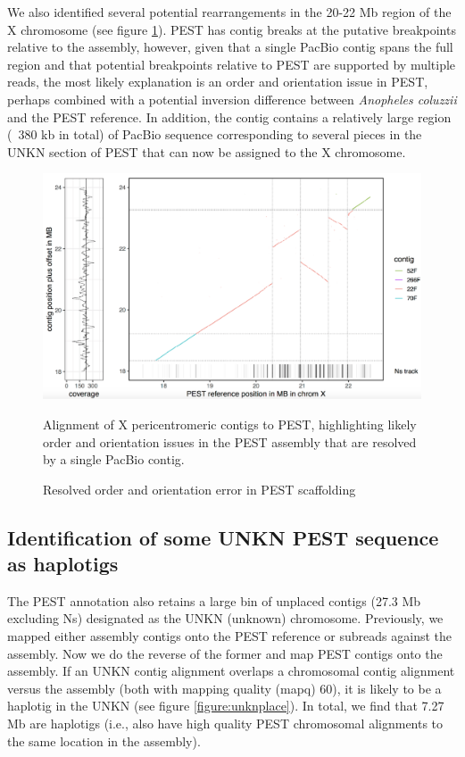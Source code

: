 \par{
We also identified several potential rearrangements in the 20-22 Mb region of the X chromosome (see figure \ref{figure:x_inversion}). PEST has contig breaks at the putative breakpoints relative to the assembly, however, given that a single PacBio contig spans the full region and that potential breakpoints relative to PEST are supported by multiple reads, the most likely explanation is an order and orientation issue in PEST, perhaps combined with a potential inversion difference between \textit{Anopheles coluzzii} and the PEST reference. In addition, the contig contains a relatively large region (~380 kb in total) of PacBio sequence corresponding to several pieces in the UNKN section of PEST that can now be assigned to the X chromosome.
}

\begin{figure}[htbp!]

\caption{Resolved order and orientation error in PEST scaffolding}
\label{figure:x_inversion}
\begin{centering}
\includegraphics[width=1.0\textwidth]{x_inversion.png}
\par{Alignment of X pericentromeric contigs to PEST, highlighting likely order and orientation issues in the PEST assembly that are resolved by a single PacBio contig.}
\end{centering}
\end{figure}


\subsection{Identification of some UNKN PEST sequence as haplotigs}

\par{
The PEST annotation also retains a large bin of unplaced contigs (27.3 Mb excluding Ns) designated as the UNKN (unknown) chromosome. Previously, we mapped either assembly contigs onto the PEST reference or subreads against the assembly. Now we do the reverse of the former and map PEST contigs onto the assembly. If an UNKN contig alignment overlaps a chromosomal contig alignment versus the assembly (both with mapping quality (mapq) 60), it is likely to be a haplotig in the UNKN (see figure \ref{figure:unknplace}). In total, we find that 7.27 Mb are haplotigs (i.e., also have high quality PEST chromosomal alignments to the same location in the assembly).
}

